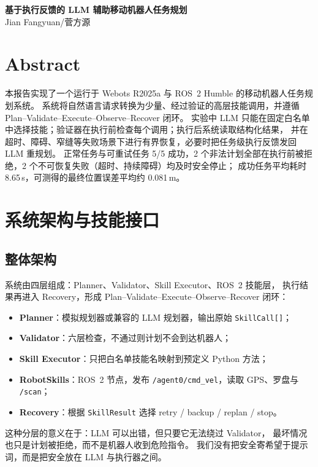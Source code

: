 \documentclass[10pt,twocolumn]{ctexart}
\begin{document}
\begin{center}
{\LARGE\bfseries 基于执行反馈的 LLM 辅助移动机器人任务规划}\\[0.5em]
Jian Fangyuan/菅方源
\end{center}

\section*{Abstract}
本报告实现了一个运行于 Webots R2025a 与 ROS~2 Humble 的移动机器人任务规划系统。
系统将自然语言请求转换为少量、经过验证的高层技能调用，并遵循 Plan--Validate--Execute--Observe--Recover 闭环。
实验中 LLM 只能在固定白名单中选择技能；验证器在执行前检查每个调用；执行后系统读取结构化结果，
并在超时、障碍、窄缝等失败场景下进行有界恢复，必要时把任务级执行反馈发回 LLM 重规划。
正常任务与可重试任务 5/5 成功，2 个非法计划全部在执行前被拒绝，2 个不可恢复失败（超时、持续障碍）均及时安全停止；
成功任务平均耗时 8.65\,s，可测得的最终位置误差平均约 0.081\,m。


\section{系统架构与技能接口}
\label{sec:arch}

\subsection{整体架构}
系统由四层组成：Planner、Validator、Skill Executor、ROS~2 技能层，
执行结果再进入 Recovery，形成 Plan--Validate--Execute--Observe--Recover 闭环：


\begin{itemize}
  \item \textbf{Planner}：模拟规划器或兼容的 LLM 规划器，输出原始 \texttt{SkillCall[]}；
  \item \textbf{Validator}：六层检查，不通过则计划不会到达机器人；
  \item \textbf{Skill Executor}：只把白名单技能名映射到预定义 Python 方法；
  \item \textbf{RobotSkills}：ROS~2 节点，发布 \texttt{/agent0/cmd\_vel}，读取 GPS、罗盘与 \texttt{/scan}；
  \item \textbf{Recovery}：根据 \texttt{SkillResult} 选择 retry / backup / replan / stop。
\end{itemize}

这种分层的意义在于：LLM 可以出错，但只要它无法绕过 Validator，
最坏情况也只是计划被拒绝，而不是机器人收到危险指令。
我们没有把安全寄希望于提示词，而是把安全放在 LLM 与执行器之间。
\end{document}
